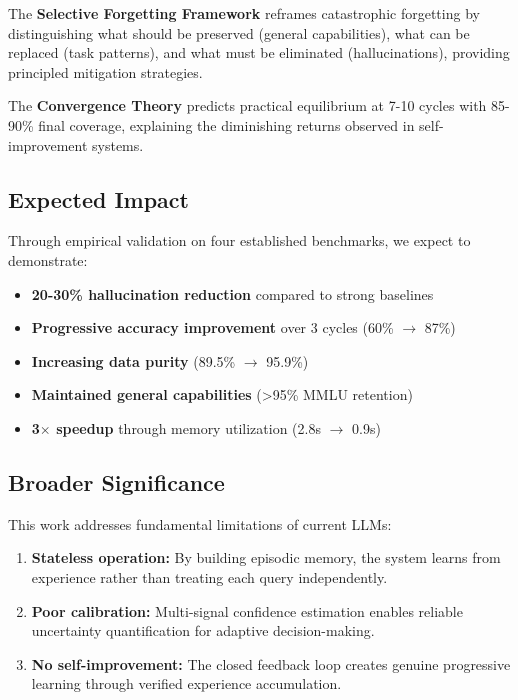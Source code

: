 \documentclass[12pt,a4paper]{article}
\theoremstyle{definition}
\begin{document}
The \textbf{Selective Forgetting Framework} reframes catastrophic forgetting by distinguishing what should be preserved (general capabilities), what can be replaced (task patterns), and what must be eliminated (hallucinations), providing principled mitigation strategies.

The \textbf{Convergence Theory} predicts practical equilibrium at 7-10 cycles with 85-90\% final coverage, explaining the diminishing returns observed in self-improvement systems.

\subsection{Expected Impact}

Through empirical validation on four established benchmarks, we expect to demonstrate:
\begin{itemize}
    \item \textbf{20-30\% hallucination reduction} compared to strong baselines
    \item \textbf{Progressive accuracy improvement} over 3 cycles (60\% $\rightarrow$ 87\%)
    \item \textbf{Increasing data purity} (89.5\% $\rightarrow$ 95.9\%)
    \item \textbf{Maintained general capabilities} (>95\% MMLU retention)
    \item \textbf{3$\times$ speedup} through memory utilization (2.8s $\rightarrow$ 0.9s)
\end{itemize}

\subsection{Broader Significance}

This work addresses fundamental limitations of current LLMs:
\begin{enumerate}
    \item \textbf{Stateless operation:} By building episodic memory, the system learns from experience rather than treating each query independently.
    
    \item \textbf{Poor calibration:} Multi-signal confidence estimation enables reliable uncertainty quantification for adaptive decision-making.
    
    \item \textbf{No self-improvement:} The closed feedback loop creates genuine progressive learning through verified experience accumulation.
\end{enumerate}
\end{document}
